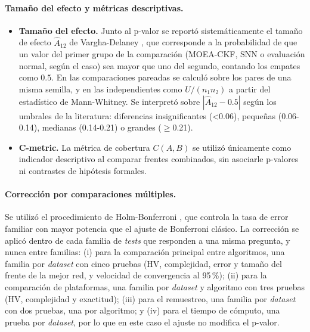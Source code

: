 \paragraph{Tamaño del efecto y métricas descriptivas.}

\begin{itemize}
    \item \textbf{Tamaño del efecto.} Junto al p-valor se reportó sistemáticamente el tamaño de efecto \(\hat{A}_{12}\) de Vargha-Delaney \cite{Vargha1998}, que corresponde a la probabilidad de que un valor del primer grupo de la comparación (MOEA-CKF, SNN o evaluación normal, según el caso) sea mayor que uno del segundo, contando los empates como $0.5$. En las comparaciones pareadas se calculó sobre los pares de una misma semilla, y en las independientes como $U/(n_1 n_2)$ a partir del estadístico de Mann-Whitney. Se interpretó sobre \(|\hat{A}_{12} - 0.5|\) según los umbrales de la literatura: diferencias insignificantes (<0.06), pequeñas (0.06-0.14), medianas (0.14-0.21) o grandes (\(\geq\)0.21).
    \item \textbf{C-metric.} La métrica de cobertura \(C(A,B)\) se utilizó únicamente como indicador descriptivo al comparar frentes combinados, sin asociarle p-valores ni contrastes de hipótesis formales.
\end{itemize}

\paragraph{Corrección por comparaciones múltiples.} Se utilizó el procedimiento de Holm-Bonferroni \cite{Holm1979}, que controla la tasa de error familiar con mayor potencia que el ajuste de Bonferroni clásico. La corrección se aplicó dentro de cada familia de \textit{tests} que responden a una misma pregunta, y nunca entre familias: (i) para la comparación principal entre algoritmos, una familia por \textit{dataset} con cinco pruebas (HV, complejidad, error y tamaño del frente de la mejor red, y velocidad de convergencia al 95\,\%); (ii) para la comparación de plataformas, una familia por \textit{dataset} y algoritmo con tres pruebas (HV, complejidad y exactitud); (iii) para el remuestreo, una familia por \textit{dataset} con dos pruebas, una por algoritmo; y (iv) para el tiempo de cómputo, una prueba por \textit{dataset}, por lo que en este caso el ajuste no modifica el p-valor.
